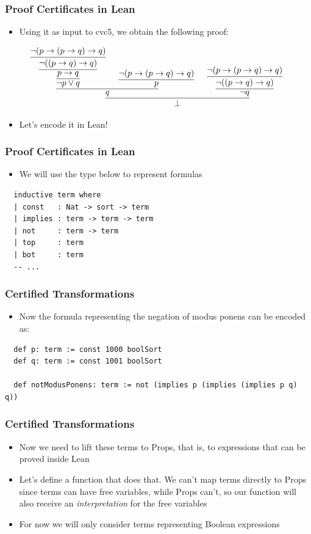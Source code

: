 \documentclass[usepdftitle=false,aspectratio=169,usenames,dvipsnames]{beamer}
\newcommand\vitem{\vfill\item}
\begin{document}
\begin{frame}
  \frametitle{Proof Certificates in Lean}
  \begin{itemize}
    \item Using it as input to cvc5, we obtain the following proof:
  \end{itemize}
  \centering
  \vfill
  \[
    \infer[]{\bot}{\infer[]{q}{\infer[]{\neg p \vee q}{\infer[]{p \rightarrow q}{\infer[]{\neg ((p \rightarrow q) \rightarrow q)}{\neg (p \rightarrow (p \rightarrow q) \rightarrow q)}}} & \infer[]{p}{\neg (p \rightarrow (p \rightarrow q) \rightarrow q)}} & \infer[]{\neg q}{\infer[]{\neg ((p \rightarrow q) \rightarrow q)}{\neg (p \rightarrow (p \rightarrow q) \rightarrow q)}}}
  \]
  \begin{itemize}
    \item Let's encode it in Lean!
  \end{itemize}
\end{frame}

\begin{frame}[fragile]
  \frametitle{Proof Certificates in Lean}
  \begin{itemize}
    \item We will use the type below to represent formulas
  \end{itemize}
  \vfill
  \begin{verbatim}
  inductive term where
  | const   : Nat -> sort -> term
  | implies : term -> term -> term
  | not     : term -> term
  | top     : term
  | bot     : term
  -- ...
  \end{verbatim}
\end{frame}

\begin{frame}[fragile]
  \frametitle{Certified Transformations}
  \begin{itemize}
    \item Now the formula representing the negation of modus ponens can be encoded as:
  \end{itemize}
  \vfill
  \begin{verbatim}
  def p: term := const 1000 boolSort
  def q: term := const 1001 boolSort

  def notModusPonens: term := not (implies p (implies (implies p q) q))
  \end{verbatim}
\end{frame}

\begin{frame}
  \frametitle{Certified Transformations}
  \begin{itemize}
    \item Now we need to lift these terms to Props, that is, to expressions that can be proved inside Lean
    \vitem Let's define a function that does that. We can't map terms directly to Props since terms can have free variables, while Props can't, so our function will also receive an \textit{interpretation} for the free variables
    \vitem For now we will only consider terms representing Boolean expressions
  \end{itemize}
\end{frame}
\end{document}
